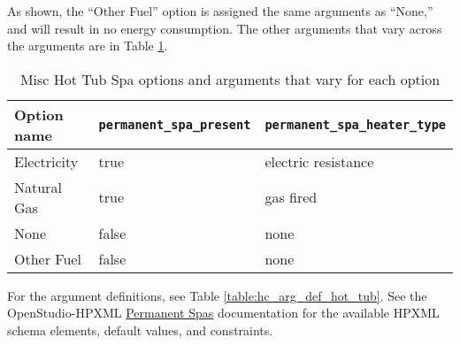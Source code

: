 As shown, the ``Other Fuel'' option is assigned the same arguments as ``None,'' and will result in no energy consumption. The other arguments that vary across the arguments are in Table \ref{table:opt_def_hot_tub}.

\begin{longtable}[]{ |p{2.5cm}|p{4cm}|p{4cm}| }
\caption{Misc Hot Tub Spa options and arguments that vary for each option} \label{table:opt_def_hot_tub} \\
\toprule\noalign{}
Option name & \texttt{permanent\_spa\_present} &
\texttt{permanent\_spa\_heater\_type} \\
\midrule\noalign{}
\endhead
\bottomrule\noalign{}
\endlastfoot
Electricity & true & electric resistance \\
Natural Gas & true & gas fired \\
None & false & none \\
Other Fuel & false & none \\
\end{longtable}

For the argument definitions, see Table \ref{table:hc_arg_def_hot_tub}. See the OpenStudio-HPXML \href{https://openstudio-hpxml.readthedocs.io/en/v1.8.1/workflow_inputs.html#hpxml-permanent-spas}{Permanent Spas} documentation for the available HPXML schema elements, default values, and constraints.

